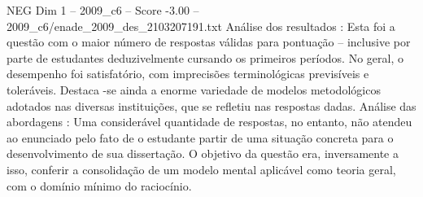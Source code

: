 \begin{textsample}{NEG Dim 1 – 2009\_c6 – Score -3.00 – 2009\_c6/enade\_2009\_des\_2103207191.txt}
Análise dos resultados : Esta foi a questão com o maior número de respostas válidas para pontuação – inclusive por parte de estudantes deduzivelmente cursando os primeiros períodos.
No geral, o desempenho foi satisfatório, com imprecisões terminológicas previsíveis e toleráveis.
Destaca -se ainda a enorme variedade de modelos metodológicos adotados nas diversas instituições, que se refletiu nas respostas dadas.
Análise das abordagens : Uma considerável quantidade de respostas, no entanto, não atendeu ao enunciado pelo fato de o estudante partir de uma situação concreta para o desenvolvimento de sua dissertação.
O objetivo da questão era, inversamente a isso, conferir a consolidação de um modelo mental aplicável como teoria geral, com o domínio mínimo do raciocínio.

\end{textsample}
